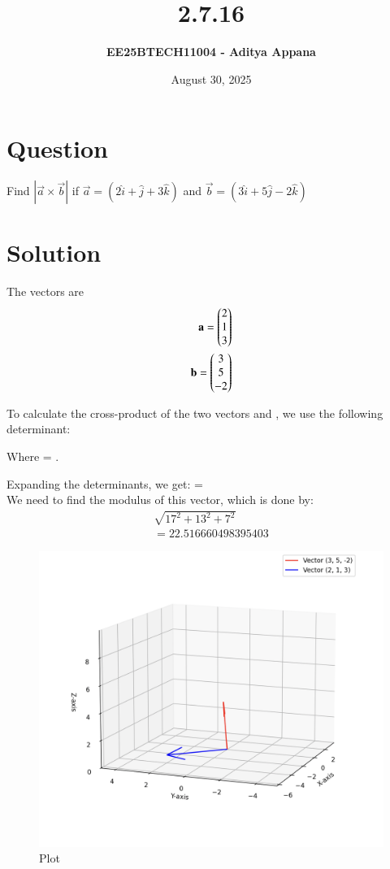 \documentclass[12pt]{article}
\title{\textbf{2.7.16}}
\author{\textbf{EE25BTECH11004 - Aditya Appana}}
\date{August 30, 2025}
\begin{document}
\maketitle

\section*{Question}
Find $|\vec{a}\times \vec{b}|$ if $\vec{a} = (2\hat{i} +\hat{j} +3\hat{k})$ and  $ \vec{b}=(3\hat{i} + 5\hat{j} - 2\hat{k})$

\section*{Solution}
The vectors are
\begin{align} 
\mathbf{a} = \begin{pmatrix}2\\1\\3\end{pmatrix}\\
\mathbf{b} = \begin{pmatrix}3\\5\\-2\end{pmatrix}
\end{align}

To calculate the cross-product of the two vectors  and , we use the following determinant:
\begin{center}
\end{center}


Where  = .


\vspace{1cm}
Expanding the determinants, we get: 
 =  \\



We need to find the modulus of this vector, which is done by:
\begin{align}
\sqrt{17^2+13^2+7^2} \\
=22.516660498395403
\end{align}

\vspace{0.5cm}


\begin{figure}[H]
    \centering
    \includegraphics[width=0.7\columnwidth]{Figs/Figure_4.png}
    \caption{Plot}
    \label{fig:placeholder}
\end{figure}
\end{document}
